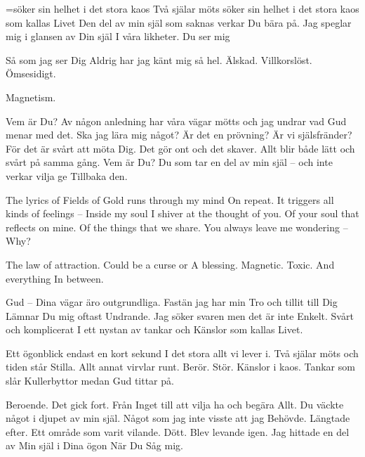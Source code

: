 




\vfil\break

\linetocenter={söker sin helhet i det stora kaos}
\startpoem
Två själar möts
söker sin helhet i det stora kaos
som kallas Livet
Den del av min själ
som saknas
verkar Du bära på. 
Jag speglar mig i glansen av
Din själ
I våra likheter.
Du ser mig

Så som jag ser Dig
Aldrig har jag känt mig så hel.
Älskad. Villkorslöst.
Ömsesidigt.

Magnetism.
\stoppoem

\startpoem
Vem är Du?
Av någon anledning har våra vägar mötts
och jag undrar vad Gud menar med det.
Ska jag lära mig något?
Är det en prövning?
Är vi själsfränder?
För det är svårt att möta Dig.
Det gör ont och det skaver.
Allt blir både lätt och svårt på 
samma gång.
Vem är Du? 
Du som tar en del av min själ – 
och inte verkar vilja ge 
Tillbaka den.
\stoppoem

\startpoem
The lyrics of Fields of Gold
runs through my mind 
On repeat.
It triggers all kinds of feelings –
Inside my soul
I shiver at the thought of you.
Of your soul that reflects on mine.
Of the things that we share.
You always leave me
wondering –
Why?




The law of attraction.
Could be a curse or
A blessing.
Magnetic.
Toxic.
And everything 
In between.
\stoppoem

\startpoem
Gud – Dina vägar äro 
outgrundliga.
Fastän jag har min 
Tro och tillit till Dig
Lämnar Du mig oftast 
Undrande.
Jag söker svaren men det är inte
Enkelt.
Svårt och komplicerat
I ett nystan av tankar och 
Känslor 
som kallas
Livet.
\stoppoem

\startpoem
Ett ögonblick
endast en kort sekund
I det stora allt vi lever i.
Två själar möts
och tiden står
Stilla.
Allt annat virvlar runt.
Berör.
Stör.
Känslor i kaos.
Tankar som slår
Kullerbyttor
medan Gud tittar på.
\stoppoem

\startpoem
Beroende.
Det gick fort.
Från Inget till att vilja ha och begära
Allt.
Du väckte något i djupet av min själ.
Något som jag inte visste att jag 
Behövde.
Längtade efter.
Ett område som varit vilande.
Dött.
Blev levande igen.
Jag hittade en del av 
Min själ 
i Dina ögon
När Du 
Såg mig.
\stoppoem

